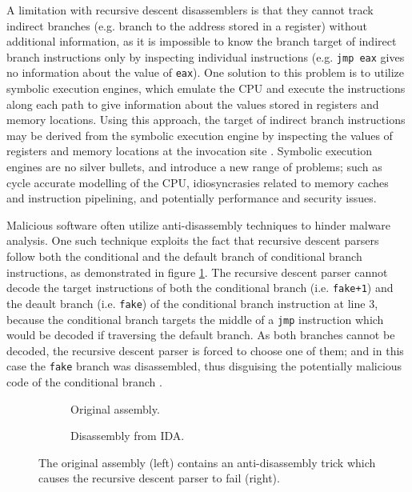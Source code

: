 A limitation with recursive descent disassemblers is that they cannot track indirect branches (e.g. branch to the address stored in a register) without additional information, as it is impossible to know the branch target of indirect branch instructions only by inspecting individual instructions (e.g. \texttt{jmp eax} gives no information about the value of \texttt{eax}). One solution to this problem is to utilize symbolic execution engines, which emulate the CPU and execute the instructions along each path to give information about the values stored in registers and memory locations. Using this approach, the target of indirect branch instructions may be derived from the symbolic execution engine by inspecting the values of registers and memory locations at the invocation site \cite{mcsema}. Symbolic execution engines are no silver bullets, and introduce a new range of problems; such as cycle accurate modelling of the CPU, idiosyncrasies related to memory caches and instruction pipelining, and potentially performance and security issues.

Malicious software often utilize anti-disassembly techniques to hinder malware analysis. One such technique exploits the fact that recursive descent parsers follow both the conditional and the default branch of conditional branch instructions, as demonstrated in figure \ref{fig:anti-disassembly}. The recursive descent parser cannot decode the target instructions of both the conditional branch (i.e. \texttt{fake+1}) and the deault branch (i.e. \texttt{fake}) of the conditional branch instruction at line 3, because the conditional branch targets the middle of a \texttt{jmp} instruction which would be decoded if traversing the default branch. As both branches cannot be decoded, the recursive descent parser is forced to choose one of them; and in this case the \texttt{fake} branch was disassembled, thus disguising the potentially malicious code of the conditional branch \cite{anti_disassembly}.

\begin{figure}[htbp]
	\centering
	\begin{subfigure}[t]{0.59\textwidth}
		
		\caption{Original assembly.}
	\end{subfigure}
	\qquad
	\begin{subfigure}[t]{0.34\textwidth}
		
		\caption{Disassembly from IDA.}
	\end{subfigure}
	\caption{The original assembly (left) contains an anti-disassembly trick which causes the recursive descent parser to fail (right).}
	\label{fig:anti-disassembly}
\end{figure}

